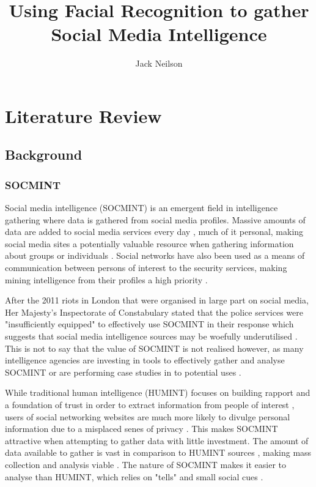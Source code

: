 \documentclass{article}
\begin{document}
\title{Using Facial Recognition to gather Social Media Intelligence}
\author{Jack Neilson}
\maketitle
\newpage
\section{Literature Review}
\subsection{Background}
\subsubsection{SOCMINT}
Social media intelligence (SOCMINT) is an emergent field in intelligence gathering where data is gathered from social media profiles. Massive amounts of data are added to social media services every day \citep{socmintoverview}, much of it personal, making social media sites a potentially valuable resource when gathering information about groups or individuals \citep{gchqmasssurveillance}. Social networks have also been used as a means of communication between persons of interest to the security services, making mining intelligence from their profiles a high priority \citep{socmintoverview}\citep{policesocmint}.

After the 2011 riots in London that were organised in large part on social media, Her Majesty's Inspectorate of Constabulary stated that the police services were "insufficiently equipped" to effectively use SOCMINT in their response \citep{socmintpublicsafety} which suggests that social media intelligence sources may be woefully underutilised \citep{socmintoverview}. This is not to say that the value of SOCMINT is not realised however, as many intelligence agencies are investing in tools to effectively gather and analyse SOCMINT \citep{socmintpublicsafety} or are performing case studies in to potential uses \citep{bostonbombingcasestudy}.

While traditional human intelligence (HUMINT) focuses on building rapport and a foundation of trust in order to extract information from people of interest \citep{humintinterrogators}, users of social networking websites are much more likely to divulge personal information due to a misplaced senes of privacy \citep{socialmediacontent}. This makes SOCMINT attractive when attempting to gather data with little investment. The amount of data available to gather is vast in comparison to HUMINT sources \citep{socmintoverview}, making mass collection and analysis viable \citep{prismslides}. The nature of SOCMINT makes it easier to analyse than HUMINT, which relies on "tells" and small social cues \citep{humintinterrogators}.
\end{document}

